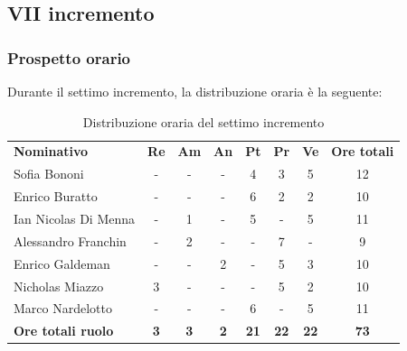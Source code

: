 \documentclass[../piano-di-progetto.tex]{subfiles}
\begin{document}
  \subsection{VII incremento}

  \subsubsection{Prospetto orario}
 Durante il settimo  incremento, la distribuzione oraria è la seguente:
  \begin{table}[H]
    \centering
    \begin{tabular}{lccccccc}
    \rowcolor{lightgray}
    \textbf{Nominativo}       & \textbf{Re} & \textbf{Am} & \textbf{An} & \textbf{Pt} & \textbf{Pr} & \textbf{Ve} & \textbf{Ore totali} \\
Sofia Bononi              & -           & -           & -           & 4           & 3           & 5           & 12                  \\
Enrico Buratto            & -           & -           & -           & 6           & 2           & 2           & 10                  \\
Ian Nicolas Di Menna      & -           & 1           & -           & 5           & -           & 5           & 11                  \\
Alessandro Franchin       & -           & 2           & -           & -           & 7           & -           & 9                   \\
Enrico Galdeman           & -           & -           & 2           & -           & 5           & 3           & 10                  \\
Nicholas Miazzo           & 3           & -           & -           & -           & 5           & 2           & 10                  \\
Marco Nardelotto          & -           & -           & -           & 6           & -           & 5           & 11                  \\
\textbf{Ore totali ruolo} & \textbf{3}  & \textbf{3}  & \textbf{2}  & \textbf{21} & \textbf{22} & \textbf{22} & \textbf{73}        
    
    \end{tabular}
    \caption{Distribuzione oraria del settimo  incremento}
  \end{table}
\end{document}
